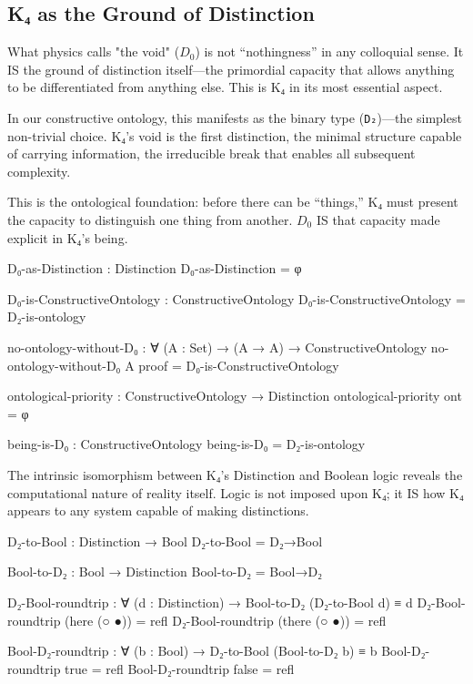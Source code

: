 \documentclass[11pt,a4paper]{book}
\begin{document}
\subsection{K₄ as the Ground of Distinction}

What physics calls "the void" ($D_0$) is not ``nothingness'' in any colloquial sense. It IS the ground of distinction itself—the primordial capacity that allows anything to be differentiated from anything else. This is K₄ in its most essential aspect.

In our constructive ontology, this manifests as the binary type (\texttt{D₂})—the simplest non-trivial choice. K₄'s void is the first distinction, the minimal structure capable of carrying information, the irreducible break that enables all subsequent complexity.

This is the ontological foundation: before there can be ``things,'' K₄ must present the capacity to distinguish one thing from another. $D_0$ IS that capacity made explicit in K₄'s being.

\begin{code}
D₀-as-Distinction : Distinction
D₀-as-Distinction = φ

D₀-is-ConstructiveOntology : ConstructiveOntology
D₀-is-ConstructiveOntology = D₂-is-ontology
\end{code}

\begin{code}
no-ontology-without-D₀ : 
  ∀ (A : Set) → 
  (A → A) →
  ConstructiveOntology
no-ontology-without-D₀ A proof = D₀-is-ConstructiveOntology

ontological-priority : 
  ConstructiveOntology → 
  Distinction
ontological-priority ont = φ

being-is-D₀ : ConstructiveOntology
being-is-D₀ = D₂-is-ontology

\end{code}

The intrinsic isomorphism between K₄'s Distinction and Boolean logic reveals the computational nature of reality itself. Logic is not imposed upon K₄; it IS how K₄ appears to any system capable of making distinctions.

\begin{code}
D₂-to-Bool : Distinction → Bool
D₂-to-Bool = D₂→Bool

Bool-to-D₂ : Bool → Distinction
Bool-to-D₂ = Bool→D₂
\end{code}

\begin{code}
D₂-Bool-roundtrip : ∀ (d : Distinction) → Bool-to-D₂ (D₂-to-Bool d) ≡ d
D₂-Bool-roundtrip (here (○ ●))  = refl
D₂-Bool-roundtrip (there (○ ●)) = refl

Bool-D₂-roundtrip : ∀ (b : Bool) → D₂-to-Bool (Bool-to-D₂ b) ≡ b
Bool-D₂-roundtrip true  = refl
Bool-D₂-roundtrip false = refl
\end{code}
\end{document}
